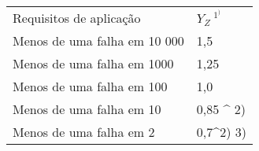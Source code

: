 \begin{table}[]
\begin{tabular}{ll}
Requisitos de aplicação      & $Y_Z \ ^1^)$\    \\
Menos de uma falha em 10 000 & 1,5       \\
Menos de uma falha em 1000   & 1,25      \\
Menos de uma falha em 100    & 1,0       \\
Menos de uma falha em 10     & 0,85 ^ 2)   \\
Menos de uma falha em 2      & 0,7^2) 3)
\end{tabular}
\end{table}